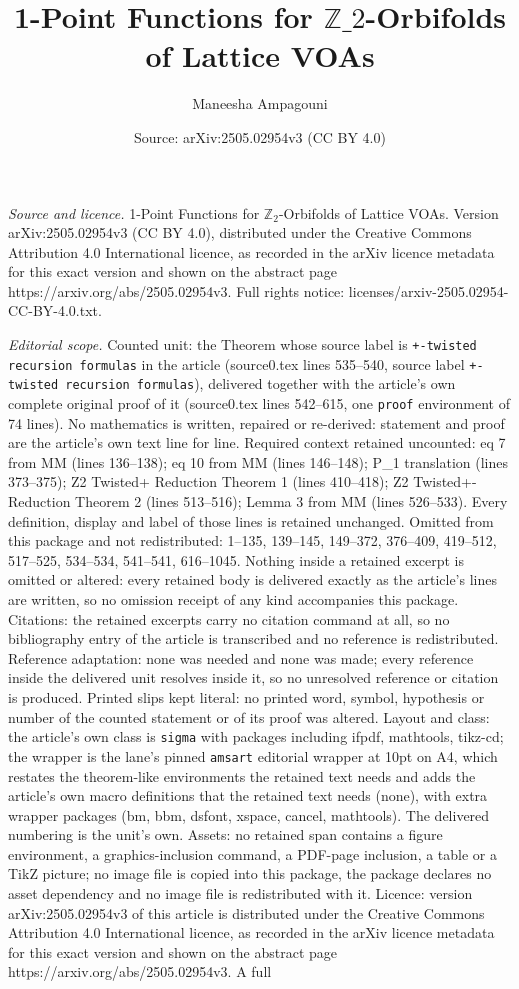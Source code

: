 \documentclass[10pt,a4paper]{amsart}
\title[1-Point Functions for $\mathbb{Z}\_2$-Orbifolds of Lattice VO]{1-Point Functions for $\mathbb{Z}\_2$-Orbifolds of Lattice VOAs}
\author{Maneesha Ampagouni}
\date{Source: arXiv:2505.02954v3 (CC BY 4.0)}
\begin{document}
\maketitle

\noindent\emph{Source and licence.} 1-Point Functions for $\mathbb{Z}_2$-Orbifolds of Lattice VOAs. Version arXiv:2505.02954v3 (CC BY 4.0), distributed under the Creative Commons Attribution 4.0 International licence, as recorded in the arXiv licence metadata for this exact version and shown on the abstract page https://arxiv.org/abs/2505.02954v3. Full rights notice: licenses/arxiv-2505.02954-CC-BY-4.0.txt.\par\smallskip

\noindent\textit{Editorial scope.} Counted unit: the Theorem whose source label is \texttt{+-twisted recursion formulas} in the article (source0.tex lines 535--540, source label \texttt{+-twisted recursion formulas}), delivered together with the article's own complete original proof of it (source0.tex lines 542--615, one \texttt{proof} environment of 74 lines). No mathematics is written, repaired or re-derived: statement and proof are the article's own text line for line. Required context retained uncounted: eq 7 from MM (lines 136--138); eq 10 from MM (lines 146--148); P\_1 translation (lines 373--375); Z2 Twisted+ Reduction Theorem 1 (lines 410--418); Z2 Twisted+- Reduction Theorem 2 (lines 513--516); Lemma 3 from MM (lines 526--533). Every definition, display and label of those lines is retained unchanged. Omitted from this package and not redistributed: 1--135, 139--145, 149--372, 376--409, 419--512, 517--525, 534--534, 541--541, 616--1045. Nothing inside a retained excerpt is omitted or altered: every retained body is delivered exactly as the article's lines are written, so no omission receipt of any kind accompanies this package. Citations: the retained excerpts carry no citation command at all, so no bibliography entry of the article is transcribed and no reference is redistributed. Reference adaptation: none was needed and none was made; every reference inside the delivered unit resolves inside it, so no unresolved reference or citation is produced. Printed slips kept literal: no printed word, symbol, hypothesis or number of the counted statement or of its proof was altered. Layout and class: the article's own class is \texttt{sigma} with packages including ifpdf, mathtools, tikz-cd; the wrapper is the lane's pinned \texttt{amsart} editorial wrapper at 10pt on A4, which restates the theorem-like environments the retained text needs and adds the article's own macro definitions that the retained text needs (none), with extra wrapper packages (bm, bbm, dsfont, xspace, cancel, mathtools). The delivered numbering is the unit's own. Assets: no retained span contains a figure environment, a graphics-inclusion command, a PDF-page inclusion, a table or a TikZ picture; no image file is copied into this package, the package declares no asset dependency and no image file is redistributed with it. Licence: version arXiv:2505.02954v3 of this article is distributed under the Creative Commons Attribution 4.0 International licence, as recorded in the arXiv licence metadata for this exact version and shown on the abstract page https://arxiv.org/abs/2505.02954v3. A full 
\end{document}
